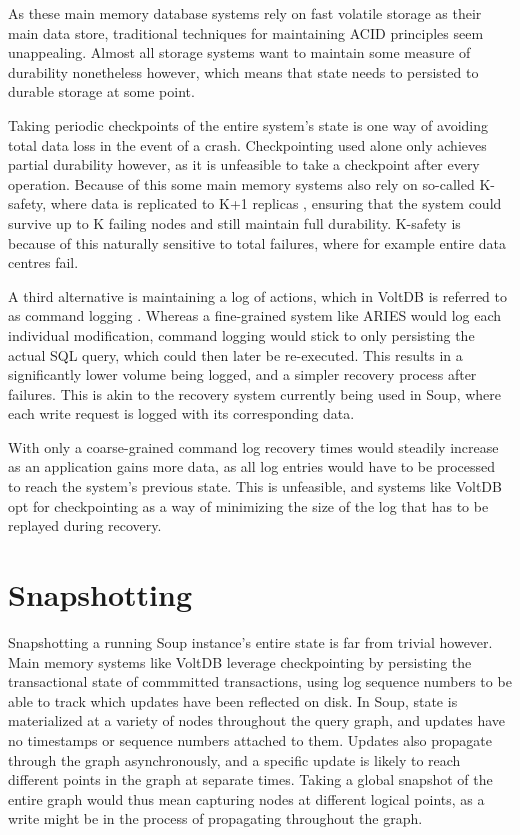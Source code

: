 \documentclass[b5paper]{report}
\begin{document}
As these main memory database systems rely on fast volatile storage as their
main data store, traditional techniques for maintaining ACID principles seem
unappealing. Almost all storage systems want to maintain some measure of
durability nonetheless however, which means that state needs to persisted to
durable storage at some point.

Taking periodic checkpoints of the entire system's state is one way of avoiding
total data loss in the event of a crash. Checkpointing used alone only achieves
partial durability however, as it is unfeasible to take a checkpoint after every
operation. Because of this some main memory systems also rely on so-called
K-safety, where data is replicated to K+1 replicas \cite{memory-checkpoint},
ensuring that the system could survive up to K failing nodes and still maintain
full durability. K-safety is because of this naturally sensitive to total
failures, where for example entire data centres fail.

A third alternative is maintaining a log of actions, which in VoltDB is referred
to as command logging \cite{voltdb-recovery}. Whereas a fine-grained system like
ARIES would log each individual modification, command logging would stick to
only persisting the actual SQL query, which could then later be re-executed.
This results in a significantly lower volume being logged, and a simpler
recovery process after failures. This is akin to the recovery system currently
being used in Soup, where each write request is logged with its corresponding
data.

With only a coarse-grained command log recovery times would steadily increase as
an application gains more data, as all log entries would have to be processed to
reach the system's previous state. This is unfeasible, and systems like VoltDB
opt for checkpointing as a way of minimizing the size of the log that has to be
replayed during recovery.

\section{Snapshotting}
Snapshotting a running Soup instance's entire state is far from trivial however.
Main memory systems like VoltDB leverage checkpointing by persisting the
transactional state of commmitted transactions, using log sequence numbers to be
able to track which updates have been reflected on disk. In Soup, state is
materialized at a variety of nodes throughout the query graph, and updates have no
timestamps or sequence numbers attached to them. Updates also propagate through
the graph asynchronously, and a specific update is likely to reach different
points in the graph at separate times. Taking a global snapshot of the entire
graph would thus mean capturing nodes at different logical points, as a write
might be in the process of propagating throughout the graph.
\end{document}
